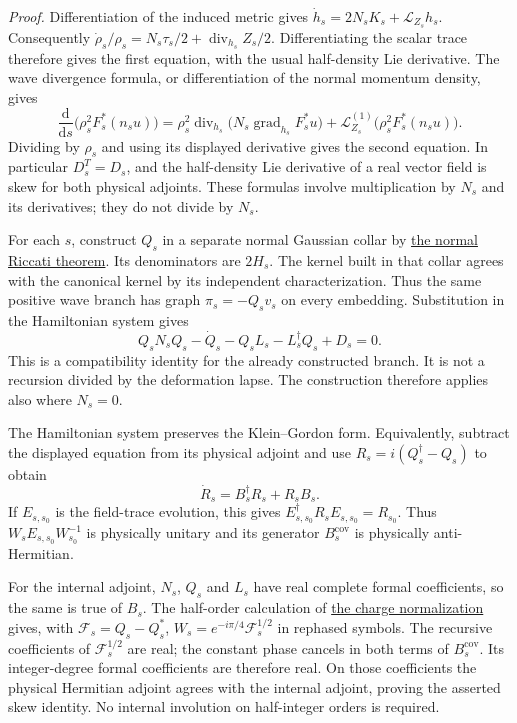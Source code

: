 \documentclass[
  english,
  11pt,
  reqno]{amsart}
\begin{document}
\emph{Proof.} Differentiation of the induced metric gives
\(\dot h_s=2N_sK_s+\mathcal L_{Z_s}h_s\). Consequently
\(\dot\rho_s/\rho_s=N_s\tau_s/2+\operatorname{div}_{h_s}Z_s/2\).
Differentiating the scalar trace therefore gives the first equation,
with the usual half-density Lie derivative. The wave divergence formula,
or differentiation of the normal momentum density, gives \[
\frac{\mathrm d}{\mathrm ds}
  \bigl(\rho_s^2F_s^*(n_su)\bigr)
=\rho_s^2\operatorname{div}_{h_s}
       \bigl(N_s\operatorname{grad}_{h_s}F_s^*u\bigr)
  +\mathcal L_{Z_s}^{(1)}
       \bigl(\rho_s^2F_s^*(n_su)\bigr).
\] Dividing by \(\rho_s\) and using its displayed derivative gives the
second equation. In particular \(D_s^T=D_s\), and the half-density Lie
derivative of a real vector field is skew for both physical adjoints.
These formulas involve multiplication by \(N_s\) and its derivatives;
they do not divide by \(N_s\).

For each \(s\), construct \(Q_s\) in a separate normal Gaussian collar
by \hyperref[thm:online-wave-normal-riccati]{the normal Riccati
theorem}. Its denominators are \(2H_s\). The kernel built in that collar
agrees with the canonical kernel by its independent characterization.
Thus the same positive wave branch has graph \(\pi_s=-Q_sv_s\) on every
embedding. Substitution in the Hamiltonian system gives%
 \[
Q_sN_sQ_s-\dot Q_s-Q_sL_s-L_s^\dagger Q_s+D_s=0.
\] This is a compatibility identity for the already constructed branch.
It is not a recursion divided by the deformation lapse. The construction
therefore applies also where \(N_s=0\).

The Hamiltonian system preserves the Klein--Gordon form. Equivalently,
subtract the displayed equation from its physical adjoint and use
\(R_s=i(Q_s^\dagger-Q_s)\) to obtain%
 \[
\dot R_s=B_s^\dagger R_s+R_sB_s.
\] If \(E_{s,s_0}\) is the field-trace evolution, this gives
\(E_{s,s_0}^\dagger R_sE_{s,s_0}=R_{s_0}\). Thus
\(W_sE_{s,s_0}W_{s_0}^{-1}\) is physically unitary and its generator
\(B_s^{\mathrm{cov}}\) is physically anti-Hermitian.

For the internal adjoint, \(N_s\), \(Q_s\) and \(L_s\) have real
complete formal coefficients, so the same is true of \(B_s\). The
half-order calculation of
\hyperref[prop:online-wave-charge-normalization]{the charge
normalization} gives, with \(\mathcal F_s=Q_s-Q_s^*\),
\(W_s=e^{-i\pi/4}\mathcal F_s^{1/2}\) in rephased symbols. The recursive
coefficients of \(\mathcal F_s^{1/2}\) are real; the constant phase
cancels in both terms of \(B_s^{\mathrm{cov}}\). Its integer-degree
formal coefficients are therefore real. On those coefficients the
physical Hermitian adjoint agrees with the internal adjoint, proving the
asserted skew identity. No internal involution on half-integer orders is
required.
\end{document}
